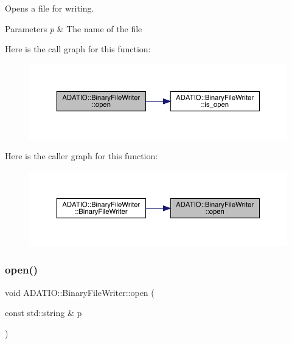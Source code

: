 Opens a file for writing. 
\begin{DoxyParams}{Parameters}
{\em p} & The name of the file \\
\hline
\end{DoxyParams}
Here is the call graph for this function\+:\nopagebreak
\begin{figure}[H]
\begin{center}
\leavevmode
\includegraphics[width=350pt]{dc/d11/classADATIO_1_1BinaryFileWriter_a943ba19816b403b36f50f72740ea856a_cgraph}
\end{center}
\end{figure}
Here is the caller graph for this function\+:\nopagebreak
\begin{figure}[H]
\begin{center}
\leavevmode
\includegraphics[width=350pt]{dc/d11/classADATIO_1_1BinaryFileWriter_a943ba19816b403b36f50f72740ea856a_icgraph}
\end{center}
\end{figure}
\mbox{\label{classADATIO_1_1BinaryFileWriter_a943ba19816b403b36f50f72740ea856a}} 
\subsubsection{\texorpdfstring{open()}{open()}\hspace{0.1cm}{\footnotesize\ttfamily [2/2]}}
{\footnotesize\ttfamily void A\+D\+A\+T\+I\+O\+::\+Binary\+File\+Writer\+::open (\begin{DoxyParamCaption}\item[{const std\+::string \&}]{p }\end{DoxyParamCaption})}

